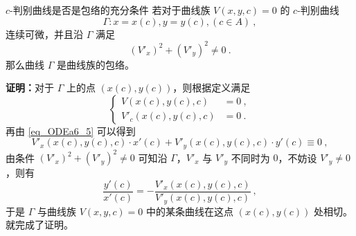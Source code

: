 \begin{theorem}{$c$-判别曲线是否是包络的充分条件}
若对于曲线族 $V(x,y,c)=0$ 的 $c$-判别曲线 
$$\Gamma: x=x(c), y=y(c), (c \in A) ~,$$
连续可微，并且沿 $\Gamma$ 满足
$$(V'_x)^2 + (V'_y)^2 \neq 0 ~.$$
那么曲线 $\Gamma$ 是曲线族的包络。
\end{theorem}
\textbf{证明：}对于 $\Gamma$ 上的点 $(x(c), y(c))$，则根据定义满足
\begin{equation}
\left \{
\begin{aligned}
V(x(c), y(c), c) &= 0~, \\
V'_c(x(c), y(c), c) &=  0~.
\end{aligned}
\right .
\end{equation}
再由 \autoref{eq_ODEa6_5} 可以得到
$$V'_x(x(c), y(c), c) \cdot x'(c) + V'_y(x(c), y(c), c) \cdot y'(c) \equiv 0 ~,$$
由条件 $(V'_x)^2 + (V'_y)^2 \neq 0$ 可知沿 $\Gamma$，$V'_x$ 与 $V'_y$ 不同时为 $0$，不妨设 $V'_y \neq 0$，则有
\begin{equation}
\frac{y'(c)}{x'(c)} = -\frac{V'_x(x(c), y(c), c)}{V'_y(x(c), y(c), c)} ~,
\end{equation}
于是 $\Gamma$ 与曲线族 $V(x, y, c)=0$ 中的某条曲线在这点 $(x(c), y(c))$ 处相切。就完成了证明。
